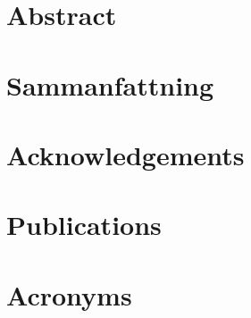 \documentclass[english]{his-thesis}
\begin{document}

\maketitle

\cleardoublepage
{}%
\setcounter{page}{1}%
\pagestyle{headings}

\frontmatter

\chapter*{Abstract}



\chapter*{Sammanfattning}



\chapter*{Acknowledgements}



\chapter*{Publications}
\label{sec:publications-list}



\tableofcontents
\listoffigures
\listoftables


\chapter*{Acronyms}
\printglossary[type=\acronymtype, nonumberlist]




\cleardoublepage
{}%
\setcounter{page}{1}%
\pagestyle{headings}
\end{document}
